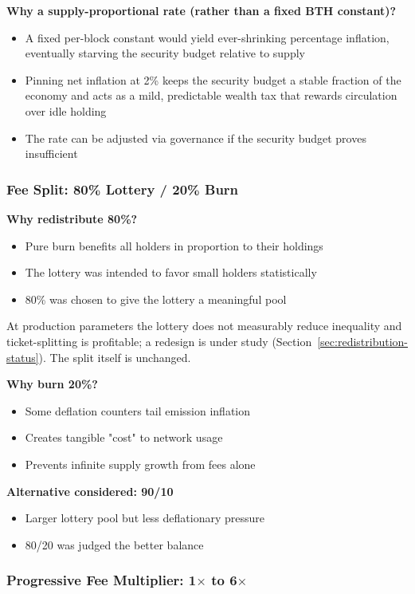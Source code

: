 \textbf{Why a supply-proportional rate (rather than a fixed BTH constant)?}
\begin{itemize}
  \item A fixed per-block constant would yield ever-shrinking percentage
    inflation, eventually starving the security budget relative to supply
  \item Pinning net inflation at 2\% keeps the security budget a stable
    fraction of the economy and acts as a mild, predictable wealth tax that
    rewards circulation over idle holding
  \item The rate can be adjusted via governance if the security budget proves
    insufficient
\end{itemize}

\subsubsection{Fee Split: 80\% Lottery / 20\% Burn}

\textbf{Why redistribute 80\%?}
\begin{itemize}
  \item Pure burn benefits all holders in proportion to their holdings
  \item The lottery was intended to favor small holders statistically
  \item 80\% was chosen to give the lottery a meaningful pool
\end{itemize}
At production parameters the lottery does not measurably reduce inequality
and ticket-splitting is profitable; a redesign is under study
(Section~\ref{sec:redistribution-status}). The split itself is unchanged.

\textbf{Why burn 20\%?}
\begin{itemize}
  \item Some deflation counters tail emission inflation
  \item Creates tangible "cost" to network usage
  \item Prevents infinite supply growth from fees alone
\end{itemize}

\textbf{Alternative considered: 90/10}
\begin{itemize}
  \item Larger lottery pool but less deflationary pressure
  \item 80/20 was judged the better balance
\end{itemize}

\subsubsection{Progressive Fee Multiplier: 1$\times$ to 6$\times$}

